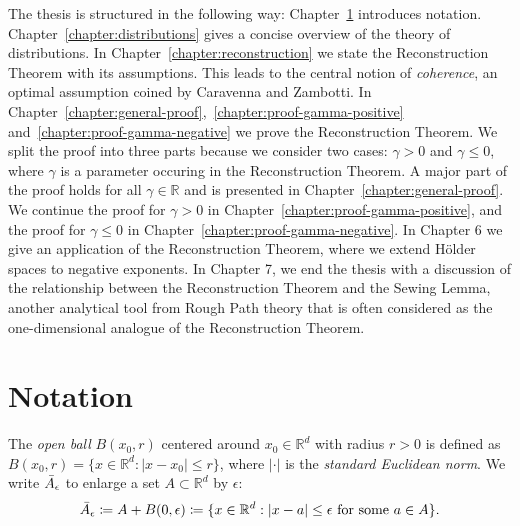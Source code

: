 The thesis is structured in the following way: Chapter~\ref{chapter:notation} introduces notation. Chapter~\ref{chapter:distributions} gives a concise overview of the theory of distributions. In Chapter~\ref{chapter:reconstruction} we state the Reconstruction Theorem with its assumptions. This leads to the central notion of \emph{coherence}, an optimal assumption coined by Caravenna and Zambotti. In Chapter~\ref{chapter:general-proof},~\ref{chapter:proof-gamma-positive} and~\ref{chapter:proof-gamma-negative} we prove the Reconstruction Theorem. We split the proof into three parts because we consider two cases: \(\gamma > 0\) and \(\gamma \leq 0\), where \({\gamma}\) is a parameter occuring in the Reconstruction Theorem. A major part of the proof holds for all \(\gamma \in \mathbb{R}\) and is presented in Chapter~\ref{chapter:general-proof}. We continue the proof for \(\gamma > 0\) in Chapter~\ref{chapter:proof-gamma-positive}, and the proof for \(\gamma \leq 0\) in Chapter~\ref{chapter:proof-gamma-negative}. In Chapter 6 we give an application of the Reconstruction Theorem, where we extend Hölder spaces to negative exponents. In Chapter 7, we end the thesis with a discussion of the relationship between the Reconstruction Theorem and the Sewing Lemma, another analytical tool from Rough Path theory that is often considered as the one-dimensional analogue of the Reconstruction Theorem.


\section{Notation}\label{chapter:notation}

The \emph{open ball} \(B(x_0, r)\)  centered around \(x_0 \in \mathbb{R}^d\) with radius \(r > 0\) is defined as \(B(x_0,r) = \{ x \in \mathbb{R}^d : |x - x_0| \leq r \} \), where \(|\cdot|\) is the \emph{standard Euclidean norm}. We write \(\bar{A}_{\epsilon}\) to enlarge a set \(A \subset \mathbb{R}^d\) by \(\epsilon \): 
\begin{align*}
    \bar{A}_{\epsilon} \coloneqq A + B(0, \epsilon) \coloneqq \{ x \in \mathbb{R}^d : |x - a| \leq \epsilon \text{ for some \(a \in A\)} \}.
\end{align*}

